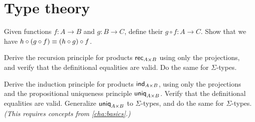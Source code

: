 

\chapter{Type theory}
\label{cha:typetheory}


\sectionExercises

\begin{ex}\label{ex:composition}
  Given functions $f:A\to B$ and $g:B\to C$, define their 
 $g\circ f:A\to C$.
  Show that we have $h \circ (g\circ f) \equiv (h\circ g)\circ f$.
\end{ex}

\begin{solution}[Alan]
  
\end{solution}

\begin{solution}[Alex]
  
\end{solution}

\begin{ex}\label{ex:pr-to-rec}
  Derive the recursion principle for products $\mathsf{rec}_{A\times B} $ using only the projections, and verify that the definitional equalities are valid.
  Do the same for $\Sigma$-types.
\end{ex}

\begin{solution}[Daniel]
  
\end{solution}

\begin{solution}[Jake]
  
\end{solution}

\begin{solution}[James]
  
\end{solution}

\begin{ex}\label{ex:pr-to-ind}
  Derive the induction principle for products $\mathsf{ind}_{A\times B}$, using only the projections and the propositional uniqueness principle $\mathsf{uniq}_{A\times B}$.
  Verify that the definitional equalities are valid.
  Generalize $\mathsf{uniq}_{A\times B}$ to $\Sigma$-types, and do the same for $\Sigma$-types.
  \emph{(This requires concepts from \cref{cha:basics}.)}
\end{ex}

